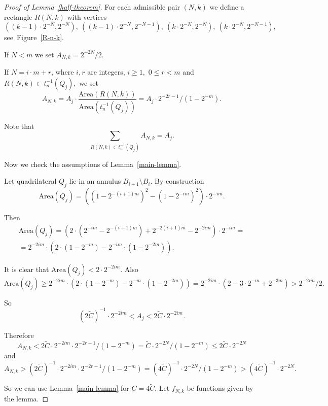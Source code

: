 \documentclass[12pt]{article}
\theoremstyle{definition}
\begin{document}
\begin{proof}[Proof of Lemma~\ref{half-theorem}]
For each admissible pair $(N, k)$ we define a rectangle $R(N,k)$ with vertices
$$
\left((k-1)\cdot 2^{-N}, 2^{-N}\right),\ \left((k-1)\cdot 2^{-N}, 2^{-N-1}\right),\ \left(k\cdot 2^{-N}, 2^{-N}\right),\ \left(k\cdot 2^{-N}, 2^{-N-1}\right),
$$
see~Figure~\ref{R-n-k}.

If $N<m$ we set $A_{N,k} = 2^{-2N}/2.$

If $N = i\cdot m + r$, where $i,r$ are integers, $i\ge1,$ $0\le r<m$  and $R(N,k)\subset t_n^{-1}(Q_j),$ we set
$$
A_{N,k} = A_j\cdot\frac{\mathrm{Area}(R(N,k))}{\mathrm{Area}\left(t_n^{-1}(Q_j)\right)} = A_j\cdot2^{-2r-1} /\left(1 - 2^{-m}\right).
$$

Note that
\begin{equation}
\label{area-equation}
\sum\limits_{R(N,k)\subset t_n^{-1}\left(Q_j\right)} A_{N,k} = A_j.
\end{equation}

Now we check the assumptions of Lemma~\ref{main-lemma}.

Let quadrilateral $Q_j$ lie in an annulus $B_{i+1}\setminus B_i.$
By construction
$$
\mathrm{Area}(Q_j) = \left(\left(1 - 2^{-(i+1)m}\right)^2 - \left(1 - 2^{-im}\right)^2\right)\cdot 2^{-im}.	
$$

Then
\begin{multline*}
\mathrm{Area}(Q_j) = \left( 2\cdot \left( 2^{-im} - 2^{-(i+1)m} \right) + 2^{-2(i+1)m} - 2^{-2im} \right)\cdot 2^{-im} = \\
 = 2^{-2im}\cdot\left(2\cdot(1-2^{-m}) - 2^{-im}\cdot(1 - 2^{-2m}) \right).
\end{multline*}

It is clear that $\mathrm{Area}(Q_j) < 2\cdot2^{-2im}.$
Also
$$
\mathrm{Area}(Q_j)\ge 
2^{-2im}\cdot\left(2\cdot(1-2^{-m}) - 2^{-m}\cdot(1 - 2^{-2m}) \right) = 
2^{-2im}\cdot\left(2 - 3\cdot2^{-m} + 2^{-3m} \right) > 2^{-2im}/2.
$$

So
$$
\left(2\widetilde C\right)^{-1}\cdot 2^{-2im} < A_j < 2\widetilde C\cdot 2^{-2im}.
$$

Therefore
$$
A_{N,k} < 2\widetilde C\cdot2^{-2im}\cdot2^{-2r-1} /\left(1 - 2^{-m}\right) = \widetilde C\cdot2^{-2N}/(1-2^{-m}) 
\le 2\widetilde C\cdot2^{-2N}$$
and
$$
A_{N,k} > \left(2\widetilde C\right)^{-1}\cdot 2^{-2im}\cdot2^{-2r-1} /\left(1 - 2^{-m}\right) = \left(4\widetilde C\right)^{-1}\cdot2^{-2N}/\left(1 - 2^{-m}\right) > \left(4\widetilde C\right)^{-1}\cdot2^{-2N}.
$$

So we can use Lemma~\ref{main-lemma} for $C = 4\widetilde C.$ Let $f_{N,k}$ be functions given by the lemma.


\end{proof}
\end{document}
